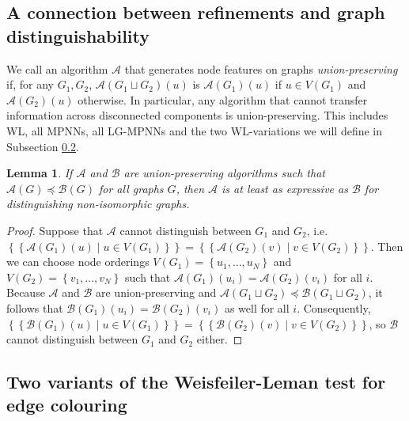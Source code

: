 \documentclass{article}
\newtheorem{lemma}[theorem]{Lemma}
\newcommand{\set}[1]{\left\{#1\right\}}
\newcommand{\multiset}[1]{\left\{\!\!\left\{#1\right\}\!\!\right\}}
\newcommand{\mca}{\mathcal{A}}
\newcommand{\mcb}{\mathcal{B}}
\begin{document}
\subsection{A connection between refinements and graph distinguishability}

We call an algorithm $\mca$ that generates node features on graphs \emph{union-preserving} if, for any $G_1,G_2$, $\mca(G_1 \sqcup G_2)(u)$ is $\mca(G_1)(u)$ if $u\in V(G_1)$ and $\mca(G_2)(u)$ otherwise.
In particular, any algorithm that cannot transfer information across disconnected components is union-preserving. This includes WL, all MPNNs, all LG-MPNNs and the two WL-variations we will define in Subsection \ref{ssec:wl-variations}.

\begin{lemma}   \label{lemma:refinement-distinguishability}
    If $\mca$ and $\mcb$ are union-preserving algorithms such that $\mca(G) \preceq \mcb(G)$ for all graphs $G$, then $\mca$ is at least as expressive as $\mcb$ for distinguishing non-isomorphic graphs.
\end{lemma}

\begin{proof}
    Suppose that $\mca$ cannot distinguish between $G_1$ and $G_2$, i.e. $\multiset{\mca(G_1)(u) \mid u\in V(G_1)} = \multiset{\mca(G_2)(v) \mid v\in V(G_2)}$. Then we can choose node orderings $V(G_1)=\set{u_1,\dots,u_N}$ and $V(G_2)=\set{v_1,\dots,v_N}$ such that $\mca(G_1)(u_i)=\mca(G_2)(v_i)$ for all $i$. Because $\mca$ and $\mcb$ are union-preserving and $\mca(G_1 \sqcup G_2) \preceq \mcb(G_1 \sqcup G_2)$, it follows that $\mcb(G_1)(u_i)=\mcb(G_2)(v_i)$ as well for all $i$. Consequently, $\multiset{\mcb(G_1)(u) \mid u\in V(G_1)} = \multiset{\mcb(G_2)(v) \mid v\in V(G_2)}$, so $\mcb$ cannot distinguish between $G_1$ and $G_2$ either.
\end{proof}


\subsection{Two variants of the Weisfeiler-Leman test for edge colouring}   \label{ssec:wl-variations}
\end{document}
